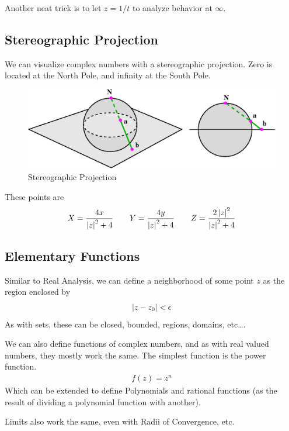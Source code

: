     Another neat trick is to let $z = 1/t$ to analyze behavior at $\infty$.

    \subsection{Stereographic Projection}
    We can visualize complex numbers with a stereographic projection. Zero
    is located at the North Pole, and infinity at the South Pole.
    \begin{figure}[H]
        \centering
        \includegraphics[scale=0.25]{./img/stereo.png}
        \caption{Stereographic Projection}
    \end{figure}
    These points are
    \begin{align*}
        X = \frac{4x}{\left\lvert z \right\rvert^2 + 4} \qquad
        Y = \frac{4y}{\left\lvert z \right\rvert^2 + 4} \qquad
        Z = \frac{2 \left\lvert z \right\rvert^2}{\left\lvert z \right\rvert^2 + 4}
    \end{align*}

    \subsection{Elementary Functions}
    Similar to Real Analysis, we can define a neighborhood of some point $z$ as
    the region enclosed by
    \begin{align*}
        \left\lvert z - z_0 \right\rvert < \epsilon
    \end{align*}
    As with sets, these can be closed, bounded, regions, domains, etc\ldots.

    We can also define functions of complex numbers, and as with real valued
    numbers, they mostly work the same. The simplest function is the power
    function.
    \begin{align*}
        f(z) = z^n
    \end{align*}
    Which can be extended to define Polynomials and rational functions (as
    the result of dividing a polynomial function with another).

    Limits also work the same, even with Radii of Convergence, etc.

